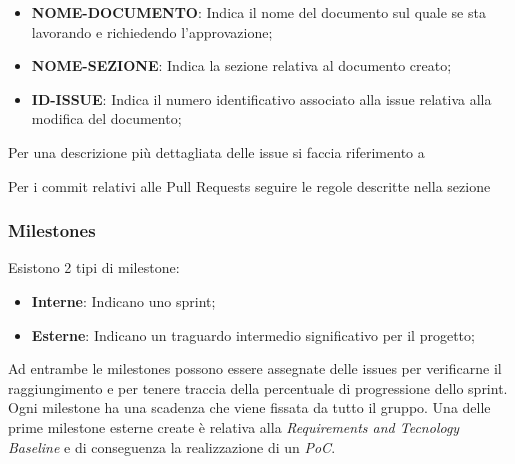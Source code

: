         \begin{itemize}
            \item \textbf{NOME-DOCUMENTO}: Indica il nome del documento sul quale se sta lavorando e richiedendo l'approvazione;
            \item \textbf{NOME-SEZIONE}: Indica la sezione relativa al documento creato;
            \item \textbf{ID-ISSUE}: Indica il numero identificativo associato alla issue relativa alla modifica del documento;
        \end{itemize}

        Per una descrizione più dettagliata delle issue si faccia riferimento a 

        Per i commit relativi alle Pull Requests seguire le regole descritte nella sezione 

        \subsubsection{Milestones}
        Esistono 2 tipi di milestone:
        \begin{itemize}
            \item \textbf{Interne}: Indicano uno sprint;
            \item \textbf{Esterne}: Indicano un traguardo intermedio significativo per il progetto;
        \end{itemize}
        Ad entrambe le milestones possono essere assegnate delle issues per verificarne il raggiungimento e per tenere traccia
        della percentuale di progressione dello sprint.
        Ogni milestone ha una scadenza che viene fissata da tutto il gruppo. Una delle prime milestone esterne create è
        relativa alla \textit{Requirements and Tecnology Baseline} e di conseguenza la realizzazione di un \textit{PoC}.


